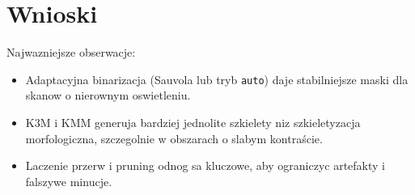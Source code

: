 \documentclass[12pt,a4paper]{article}
\begin{document}
\section{Wnioski}

Najwazniejsze obserwacje:
\begin{itemize}
    \item Adaptacyjna binarizacja (Sauvola lub tryb \texttt{auto}) daje stabilniejsze maski dla skanow o nierownym oswietleniu.
    \item K3M i KMM generuja bardziej jednolite szkielety niz szkieletyzacja morfologiczna, szczegolnie w obszarach o slabym kontraście.
    \item Laczenie przerw i pruning odnog sa kluczowe, aby ograniczyc artefakty i falszywe minucje.
\end{itemize}
\end{document}
